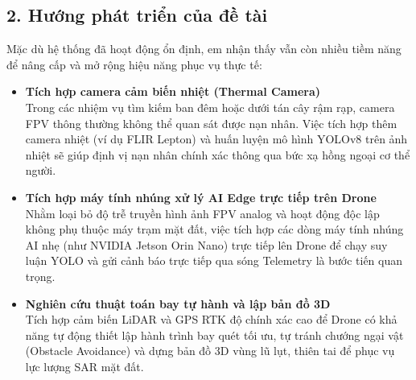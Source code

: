 \subsection*{2. Hướng phát triển của đề tài}

Mặc dù hệ thống đã hoạt động ổn định, em nhận thấy vẫn còn nhiều tiềm năng để nâng cấp và mở rộng hiệu năng phục vụ thực tế:

\begin{itemize}
    \item \textbf{Tích hợp camera cảm biến nhiệt (Thermal Camera)}\\
    Trong các nhiệm vụ tìm kiếm ban đêm hoặc dưới tán cây rậm rạp, camera FPV thông thường không thể quan sát được nạn nhân. Việc tích hợp thêm camera nhiệt (ví dụ FLIR Lepton) và huấn luyện mô hình YOLOv8 trên ảnh nhiệt sẽ giúp định vị nạn nhân chính xác thông qua bức xạ hồng ngoại cơ thể người.

    \item \textbf{Tích hợp máy tính nhúng xử lý AI Edge trực tiếp trên Drone}\\
    Nhằm loại bỏ độ trễ truyền hình ảnh FPV analog và hoạt động độc lập không phụ thuộc máy trạm mặt đất, việc tích hợp các dòng máy tính nhúng AI nhẹ (như NVIDIA Jetson Orin Nano) trực tiếp lên Drone để chạy suy luận YOLO và gửi cảnh báo trực tiếp qua sóng Telemetry là bước tiến quan trọng.

    \item \textbf{Nghiên cứu thuật toán bay tự hành và lập bản đồ 3D}\\
    Tích hợp cảm biến LiDAR và GPS RTK độ chính xác cao để Drone có khả năng tự động thiết lập hành trình bay quét tối ưu, tự tránh chướng ngại vật (Obstacle Avoidance) và dựng bản đồ 3D vùng lũ lụt, thiên tai để phục vụ lực lượng SAR mặt đất.
\end{itemize}

